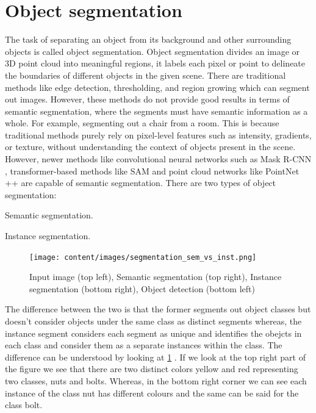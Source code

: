 \section{Object segmentation}
The task of separating an object from its background and other surrounding objects is called object segmentation. Object segmentation divides an image or 3D point cloud
 into meaningful regions, it labels each pixel or point to delineate the boundaries of different objects in the given scene. There are traditional methods like edge detection, 
 thresholding, and region growing which can segment out images. However, these methods do not provide good results in terms of semantic segmentation, where the segments must 
 have semantic information as a whole. For example, segmenting out a chair from a room. This is because traditional methods purely rely on 
 pixel-level features such as intensity, gradients, or texture, without understanding the context of objects present in the scene. However, newer methods like convolutional
 neural networks such as Mask R-CNN \cite{he2018maskrcnn}, transformer-based methods like SAM and point cloud networks like PointNet ++ are capable of semantic segmentation. 
 There are two types of object segmentation:
 \begin{compactenum}[1.]
    \item	Semantic segmentation.
    \item	Instance segmentation.
 \end{compactenum}
\begin{figure}[ht!]
    \centering
    \texttt{[image: content/images/segmentation\_sem\_vs\_inst.png]}
    \caption{Input image (top left), Semantic segmentation (top right), Instance segmentation (bottom right), Object detection (bottom left)}
    \label{fig:segmentation_sem_vs_inst}
\end{figure}
The difference between the two is that the former segments out object classes but doesn't consider objects under the same class as distinct segments whereas, the instance segment 
considers each segment as unique and identifies the obejcts in each class and consider them as a separate instances within the class. The difference can be understood by looking at 
\cref{fig:segmentation_sem_vs_inst} \cite{Sharma2022}. If we look at the top right part of the figure we see that there are two distinct colors yellow and red representing two
classes, nuts and bolts. Whereas, in the bottom right corner we can see each instance of the class nut has different colours and the same can be said for the class bolt.
